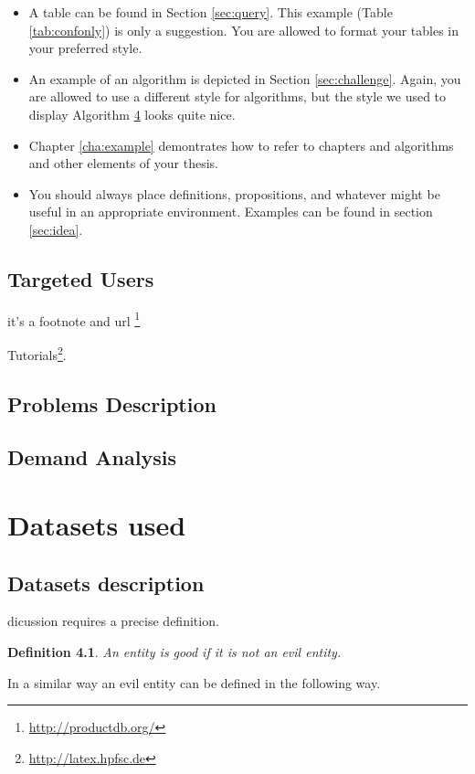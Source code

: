 \documentclass[11pt,titlepage,oneside,openany]{book}
\newtheorem{definition}{Definition}
\begin{document}
\begin{itemize}
	\item A table can be found in Section \ref{sec:query}. This example (Table \ref{tab:confonly}) is only a suggestion. You are allowed to format your tables in your preferred style.
	\item An example of an algorithm is depicted in Section \ref{sec:challenge}. Again, you are allowed to use a different style for algorithms, but the style we used to display Algorithm \ref{cha:dataset} looks quite nice.
	\item Chapter \ref{cha:example} demontrates how to refer to chapters and algorithms and other elements of your thesis.
	\item You should always place definitions, propositions, and whatever might be useful in an appropriate environment.  Examples can be found in section \ref{sec:idea}.
\end{itemize}




 
\section{Targeted Users}
 
it's  a footnote and url
\footnote{\url{http://productdb.org/}}


Tutorials\footnote{\url{http://latex.hpfsc.de}}.  


\section{Problems Description}

 

\section{Demand Analysis}



\chapter{Datasets used}
\label{cha:dataset}




\section{Datasets description}
\label{sec:datadesc}

 dicussion requires a precise definition.
\begin{definition}
\label{def:good}
An entity is good if it is not an evil entity.
\end{definition}
In a similar way an evil entity can be defined in the following way.
\end{document}

